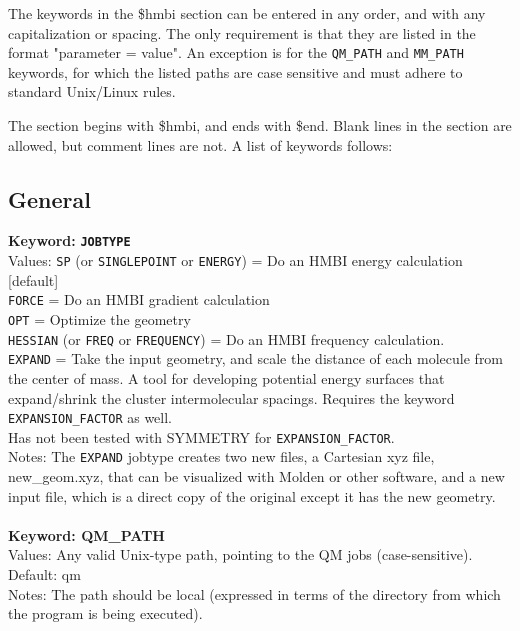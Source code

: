 \documentclass[11pt,letterpaper]{article}
\begin{document}
\begin{spacing}{1.0}
The keywords in the \$hmbi section can be entered in any order, and with 
any capitalization or spacing.  The only requirement is that they are 
listed in the format "parameter = value".  An exception is for the 
{\tt QM\_PATH} and {\tt MM\_PATH} keywords, for which the listed paths are case 
sensitive and must adhere to standard Unix/Linux rules.

The section begins with \$hmbi, and ends with \$end.  Blank lines in 
the section are allowed, but comment lines are not. A list of keywords follows:
\\

\subsection{General}

\noindent
\textbf{Keyword:} {\tt \bf JOBTYPE} \\
Values:  {\tt SP} (or {\tt SINGLEPOINT} or {\tt ENERGY}) = Do an HMBI 
         energy calculation [default] \\
	 {\tt FORCE} = Do an HMBI gradient calculation \\
         {\tt OPT} = Optimize the geometry \\
	 {\tt HESSIAN} (or {\tt FREQ} or {\tt FREQUENCY}) = 
         Do an HMBI frequency calculation.  \\
	 {\tt EXPAND} = Take the input geometry, and scale the distance of each
	 molecule from the center of mass.  A tool for developing potential
	 energy surfaces that expand/shrink the cluster intermolecular spacings.
	 Requires the keyword {\tt EXPANSION\_FACTOR}  as well. \\
         Has not been tested with SYMMETRY for {\tt EXPANSION\_FACTOR}. \\
Notes:   The {\tt EXPAND} jobtype creates two new files, a Cartesian xyz file,
	 new\_geom.xyz, that can be visualized with Molden or other software,
	 and a new input file, which is a direct copy of the original except
	 it has the new geometry. \\ \\ 


\noindent
\textbf{Keyword: QM\_PATH} \\
Values:  Any valid Unix-type path, pointing to the QM jobs 
	 (case-sensitive). \\
Default: qm\\
Notes:   The path should be local (expressed in terms of the directory from
	 which the program is being executed). \\


\end{spacing}
\end{document}
